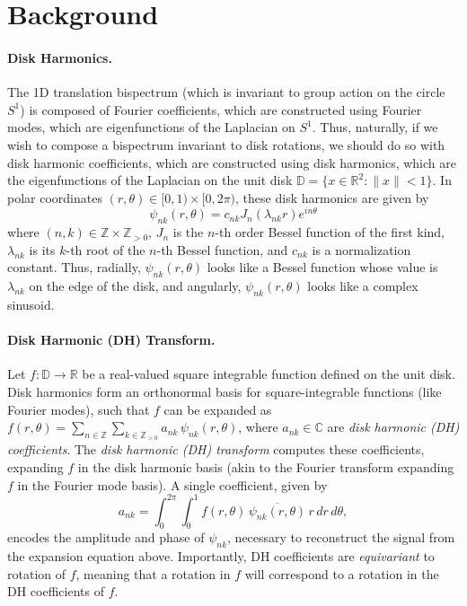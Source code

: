 \section{Background}
\paragraph{Disk Harmonics.}
The 1D translation bispectrum (which is invariant to group action on the circle $S^1$) is composed of Fourier coefficients, which are constructed using Fourier modes, which are eigenfunctions of the Laplacian on $S^1$. Thus, naturally, if we wish to compose a bispectrum invariant to disk rotations, we should do so with disk harmonic coefficients, which are constructed using disk harmonics, which are the eigenfunctions of the Laplacian on the unit disk $\mathbb{D} = \{ x \in \mathbb{R}^2 : \|x\| < 1 \}$. In polar coordinates \( (r, \theta) \in [0,1) \times [0, 2\pi) \), these disk harmonics are given by
\[
\psi_{nk}(r, \theta) = c_{nk} J_n(\lambda_{nk} r) e^{in\theta}
\]
where \( (n, k) \in \mathbb{Z} \times \mathbb{Z}_{>0} \), \( J_n \) is the $n$-th order Bessel function of the first kind, \( \lambda_{nk} \) is its \( k \)-th root of the $n$-th Bessel function, and \( c_{nk} \) is a normalization constant. Thus, radially, $\psi_{nk}(r, \theta)$ looks like a Bessel function whose value is \( \lambda_{nk} \) on the edge of the disk, and angularly, $\psi_{nk}(r, \theta)$ looks like a complex sinusoid.

\paragraph{Disk Harmonic (DH) Transform.} Let $f : \mathbb{D} \to \mathbb{R}$ be a real-valued square integrable function defined on the unit disk. Disk harmonics form an orthonormal basis for square-integrable functions (like Fourier modes), such that $f$ can be expanded as
$f(r, \theta) = \sum_{n \in \mathbb{Z}} \sum_{k \in \mathbb{Z}_{>0}} a_{nk} \, \psi_{nk}(r, \theta)$,
where $a_{nk} \in \mathbb{C}$ are \textit{disk harmonic (DH) coefficients}. The \textit{disk harmonic (DH) transform} computes these coefficients, expanding $f$ in the disk harmonic basis (akin to the Fourier transform expanding $f$ in the Fourier mode basis). A single coefficient, given by
\[
a_{nk} = \int_0^{2\pi} \int_0^1 f(r, \theta) \, \overline{\psi_{nk}(r, \theta)} \, r \, dr \, d\theta,
\]
encodes the amplitude and phase of $\psi_{nk}$, necessary to reconstruct the signal from the expansion equation above. Importantly, DH coefficients are \textit{equivariant} to rotation of $f$, meaning that a rotation in $f$ will correspond to a rotation in the DH coefficients of $f$.

